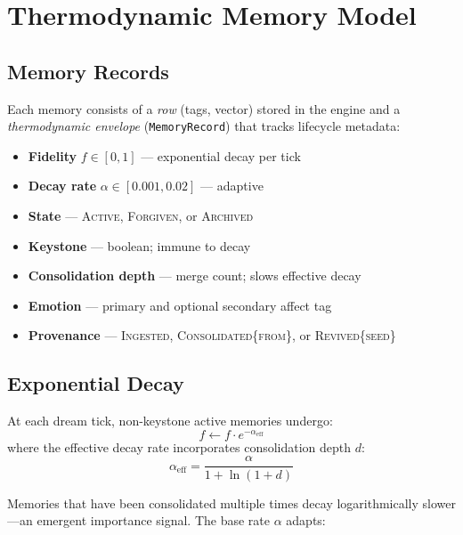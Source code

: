 \documentclass[twocolumn,10pt]{article}
\begin{document}
\section{Thermodynamic Memory Model}

\subsection{Memory Records}

Each memory consists of a \textit{row} (tags, vector) stored in the engine
and a \textit{thermodynamic envelope} (\texttt{MemoryRecord}) that tracks
lifecycle metadata:

\begin{itemize}[leftmargin=*,itemsep=1pt]
\item \textbf{Fidelity} $f \in [0, 1]$ --- exponential decay per tick
\item \textbf{Decay rate} $\alpha \in [0.001, 0.02]$ --- adaptive
\item \textbf{State} --- \textsc{Active}, \textsc{Forgiven}, or
  \textsc{Archived}
\item \textbf{Keystone} --- boolean; immune to decay
\item \textbf{Consolidation depth} --- merge count; slows effective decay
\item \textbf{Emotion} --- primary and optional secondary affect tag
\item \textbf{Provenance} --- \textsc{Ingested}, \textsc{Consolidated\{from\}},
  or \textsc{Revived\{seed\}}
\end{itemize}

\subsection{Exponential Decay}

At each dream tick, non-keystone active memories undergo:
\begin{equation}
f \leftarrow f \cdot e^{-\alpha_{\mathrm{eff}}}
\end{equation}
where the effective decay rate incorporates consolidation depth $d$:
\begin{equation}
\alpha_{\mathrm{eff}} = \frac{\alpha}{1 + \ln(1 + d)}
\end{equation}

Memories that have been consolidated multiple times decay logarithmically
slower---an emergent importance signal.  The base rate $\alpha$ adapts:
\end{document}
